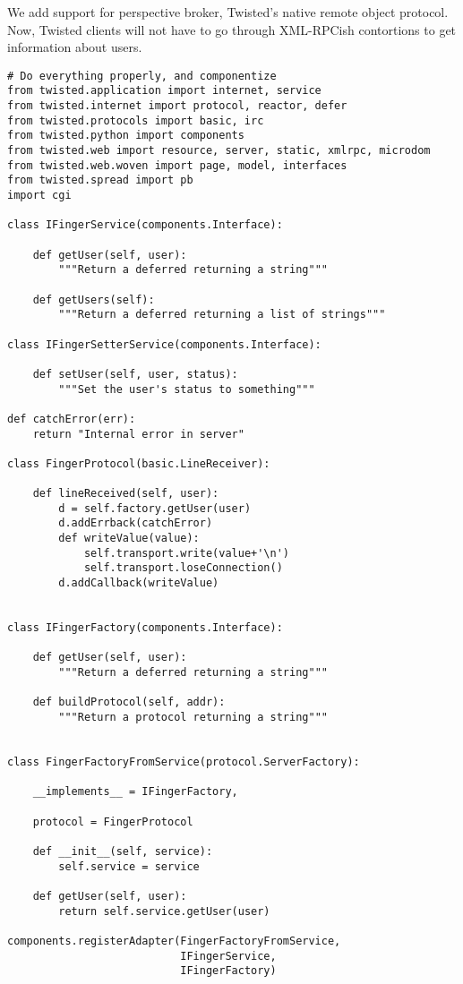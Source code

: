We add support for perspective broker, Twisted's native remote object protocol. Now, Twisted clients will not have to go through XML-RPCish contortions to get information about users.\begin{verbatim}
# Do everything properly, and componentize
from twisted.application import internet, service
from twisted.internet import protocol, reactor, defer
from twisted.protocols import basic, irc
from twisted.python import components
from twisted.web import resource, server, static, xmlrpc, microdom
from twisted.web.woven import page, model, interfaces
from twisted.spread import pb
import cgi

class IFingerService(components.Interface):

    def getUser(self, user):
        """Return a deferred returning a string"""

    def getUsers(self):
        """Return a deferred returning a list of strings"""

class IFingerSetterService(components.Interface):

    def setUser(self, user, status):
        """Set the user's status to something"""

def catchError(err):
    return "Internal error in server"

class FingerProtocol(basic.LineReceiver):

    def lineReceived(self, user):
        d = self.factory.getUser(user)
        d.addErrback(catchError)
        def writeValue(value):
            self.transport.write(value+'\n')
            self.transport.loseConnection()
        d.addCallback(writeValue)


class IFingerFactory(components.Interface):

    def getUser(self, user):
        """Return a deferred returning a string"""

    def buildProtocol(self, addr):
        """Return a protocol returning a string"""


class FingerFactoryFromService(protocol.ServerFactory):

    __implements__ = IFingerFactory,

    protocol = FingerProtocol

    def __init__(self, service):
        self.service = service

    def getUser(self, user):
        return self.service.getUser(user)

components.registerAdapter(FingerFactoryFromService,
                           IFingerService,
                           IFingerFactory)


\end{verbatim}
